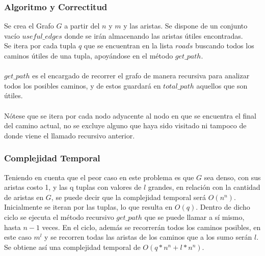 \documentclass{article}
\begin{document}
\subsubsection{Algoritmo y  Correctitud}
Se crea el Grafo $G$ a partir del $n$ y $m$ y las aristas. Se dispone de un conjunto vacío $useful\_edges$ donde se irán almacenando las aristas útiles encontradas.
\\
Se itera por cada tupla $q$ que se encuentran en la lista $roads$ buscando todos los caminos útiles de una tupla, apoyándose en el método $get\_path$.
\\
\\
$get\_path$ es el encargado de recorrer el grafo de manera recursiva para analizar todos los posibles caminos, y de estos guardará en $total\_path$ aquellos que son útiles.
\\
\\
Nótese que se itera por cada nodo adyacente al nodo en que se encuentra el final del camino actual, no se excluye alguno que haya sido visitado ni tampoco de donde viene el llamado recursivo anterior.

\subsubsection{Complejidad Temporal}
Teniendo en cuenta que el peor caso en este problema es que $G$ sea denso, con sus aristas costo 1, y las q tuplas con valores de $l$ grandes, en relación con la cantidad de aristas en $G$, se puede decir que la complejidad temporal será $O(n^n)$.
\\
Inicialmente se iteran por las tuplas, lo que resulta en $O(q)$. Dentro de dicho ciclo se ejecuta el método recursivo $get\_path$ que se puede llamar a sí mismo, hasta $n-1$ veces. En el ciclo, además se recorrerán todos los caminos posibles, en este caso $m^l$ y se recorren todas las aristas de los caminos que a los sumo serán $l$. Se obtiene así una complejidad temporal de $O(q*n^n + l*n^n)$.
\end{document}

